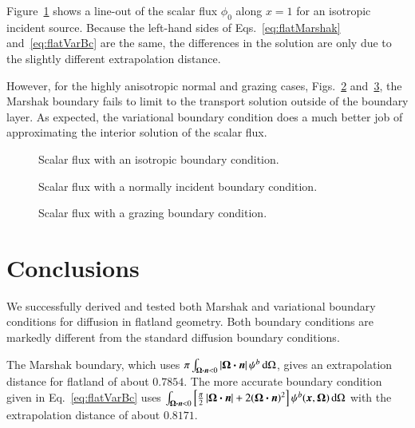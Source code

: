 \documentclass{anstrans}
\begin{document}
Figure~\ref{fig:isotropic} shows a line-out of the scalar flux $\phi_0$ along
$x=1$ for an isotropic incident source. Because the left-hand sides of
Eqs.~\eqref{eq:flatMarshak} and~\eqref{eq:flatVarBc} are the same, the
differences in the solution are only due to the slightly different
extrapolation distance.

However, for the highly anisotropic normal and grazing cases,
Figs.~\ref{fig:delta} and~\ref{fig:grazing}, the Marshak boundary fails to
limit to the transport solution outside of the boundary layer. As
expected, the variational boundary condition does a much better job of
approximating the interior solution of the scalar flux.


\begin{figure}[htb!]
  \centering
  \hspace{-.5in}
  
  \hspace{-.5in}
  \caption{Scalar flux with an isotropic boundary condition.}
  \label{fig:isotropic}
\end{figure}

\begin{figure}[htb!]
  \centering
  \hspace{-.5in}
  
  \hspace{-.5in}
  \caption{Scalar flux with a normally incident boundary condition.}
  \label{fig:delta}
\end{figure}

\begin{figure}[htb!]
  \centering
  \hspace{-.5in}
  
  \hspace{-.5in}
  \caption{Scalar flux with a grazing boundary condition.}
  \label{fig:grazing}
\end{figure}

\section{Conclusions}
We successfully derived and tested both Marshak and variational boundary
conditions for diffusion in flatland geometry. Both boundary conditions are
markedly different from the standard diffusion boundary conditions.

The Marshak boundary, which uses $\pi \int_{\bm{\Omega}\bm{\cdot} \bm{n} < 0 }
\left| \bm{\Omega}\bm{\cdot} \bm{n} \right| \psi^b \mathop{}\!\mathrm{d}\Omega$, gives an extrapolation
distance for flatland of about $0.7854$.
The more accurate boundary condition given in Eq.~\eqref{eq:flatVarBc} uses 
$\int_{\bm{\Omega}\bm{\cdot}\bm{n} < 0} \left[ \frac{\pi}{2}
\left| \bm{\Omega}\bm{\cdot}\bm{n} \right| + 2 (\bm{\Omega}\bm{\cdot}\bm{n})^2 \right]
\psi^b(\bm{x}, \bm{\Omega}) \mathop{}\!\mathrm{d}\Omega$ with the extrapolation distance of
about $0.8171$.



\end{document}

